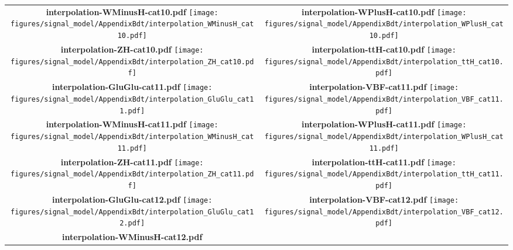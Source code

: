 \begin{longtable}{|c|c|}
{}
 \\
\hline
\parbox{0.47\textwidth}{
\centering
{\bfseries interpolation-WMinusH-cat10.pdf}
\texttt{[image: figures/signal\_model/AppendixBdt/interpolation\_WMinusH\_cat10.pdf]}
}
 & \parbox{0.47\textwidth}{
\centering
{\bfseries interpolation-WPlusH-cat10.pdf}
\texttt{[image: figures/signal\_model/AppendixBdt/interpolation\_WPlusH\_cat10.pdf]}
}
 \\
\hline
\parbox{0.47\textwidth}{
\centering
{\bfseries interpolation-ZH-cat10.pdf}
\texttt{[image: figures/signal\_model/AppendixBdt/interpolation\_ZH\_cat10.pdf]}
}
 & \parbox{0.47\textwidth}{
\centering
{\bfseries interpolation-ttH-cat10.pdf}
\texttt{[image: figures/signal\_model/AppendixBdt/interpolation\_ttH\_cat10.pdf]}
}
 \\
\hline
\parbox{0.47\textwidth}{
\centering
{\bfseries interpolation-GluGlu-cat11.pdf}
\texttt{[image: figures/signal\_model/AppendixBdt/interpolation\_GluGlu\_cat11.pdf]}
}
 & \parbox{0.47\textwidth}{
\centering
{\bfseries interpolation-VBF-cat11.pdf}
\texttt{[image: figures/signal\_model/AppendixBdt/interpolation\_VBF\_cat11.pdf]}
}
 \\
\hline
\parbox{0.47\textwidth}{
\centering
{\bfseries interpolation-WMinusH-cat11.pdf}
\texttt{[image: figures/signal\_model/AppendixBdt/interpolation\_WMinusH\_cat11.pdf]}
}
 & \parbox{0.47\textwidth}{
\centering
{\bfseries interpolation-WPlusH-cat11.pdf}
\texttt{[image: figures/signal\_model/AppendixBdt/interpolation\_WPlusH\_cat11.pdf]}
}
 \\
\hline
\parbox{0.47\textwidth}{
\centering
{\bfseries interpolation-ZH-cat11.pdf}
\texttt{[image: figures/signal\_model/AppendixBdt/interpolation\_ZH\_cat11.pdf]}
}
 & \parbox{0.47\textwidth}{
\centering
{\bfseries interpolation-ttH-cat11.pdf}
\texttt{[image: figures/signal\_model/AppendixBdt/interpolation\_ttH\_cat11.pdf]}
}
 \\
\hline
\parbox{0.47\textwidth}{
\centering
{\bfseries interpolation-GluGlu-cat12.pdf}
\texttt{[image: figures/signal\_model/AppendixBdt/interpolation\_GluGlu\_cat12.pdf]}
}
 & \parbox{0.47\textwidth}{
\centering
{\bfseries interpolation-VBF-cat12.pdf}
\texttt{[image: figures/signal\_model/AppendixBdt/interpolation\_VBF\_cat12.pdf]}
}
 \\
\hline
\parbox{0.47\textwidth}{
\centering
{\bfseries interpolation-WMinusH-cat12.pdf}
}
\end{longtable}
